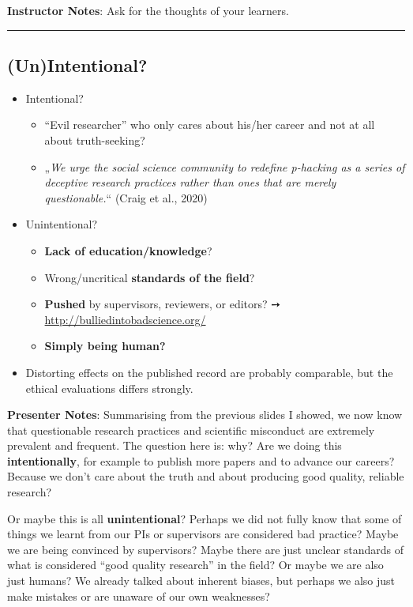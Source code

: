 \documentclass[
  english,
  letterpaper,
  DIV=11,
  numbers=noendperiod]{scrartcl}
\providecommand{\tightlist}{%
  \setlength{\itemsep}{0pt}\setlength{\parskip}{0pt}}
\begin{document}
\textbf{Instructor Notes}: Ask for the thoughts of your learners.

\begin{center}\rule{0.5\linewidth}{0.5pt}\end{center}

\subsection{(Un)Intentional?}\label{unintentional}

\begin{itemize}
\tightlist
\item
  Intentional?

  \begin{itemize}
  \tightlist
  \item
    ``Evil researcher'' who only cares about his/her career and not at
    all about truth-seeking?
  \item
    „\emph{We urge the social science community to redefine p-hacking as
    a series of deceptive research practices rather than ones that are
    merely questionable.}`` (Craig et al., 2020)
  \end{itemize}
\item
  Unintentional?

  \begin{itemize}
  \tightlist
  \item
    \textbf{Lack of education/knowledge}?
  \item
    Wrong/uncritical \textbf{standards of the field}?
  \item
    \textbf{Pushed} by supervisors, reviewers, or editors? ➙
    \url{http://bulliedintobadscience.org/}
  \item
    \textbf{Simply being human?}
  \end{itemize}
\item
  Distorting effects on the published record are probably comparable,
  but the ethical evaluations differs strongly.
\end{itemize}

\textbf{Presenter Notes}: Summarising from the previous slides I showed,
we now know that questionable research practices and scientific
misconduct are extremely prevalent and frequent. The question here is:
why? Are we doing this \textbf{intentionally}, for example to publish
more papers and to advance our careers? Because we don't care about the
truth and about producing good quality, reliable research?

Or maybe this is all \textbf{unintentional}? Perhaps we did not fully
know that some of things we learnt from our PIs or supervisors are
considered bad practice? Maybe we are being convinced by supervisors?
Maybe there are just unclear standards of what is considered ``good
quality research'' in the field? Or maybe we are also just humans? We
already talked about inherent biases, but perhaps we also just make
mistakes or are unaware of our own weaknesses?
\end{document}

